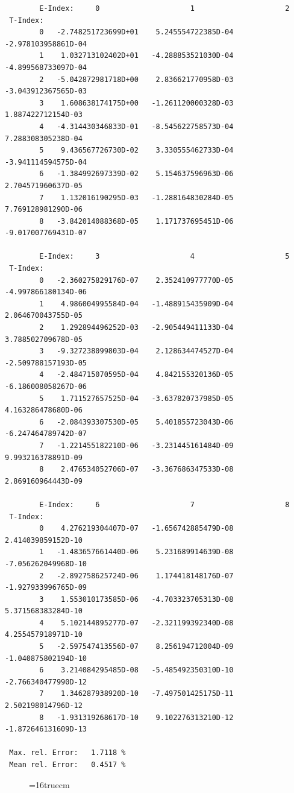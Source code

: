 \documentclass[12pt,dvips]{article}
\begin{document}
\begin{small}\begin{verbatim}
        E-Index:     0                     1                     2
 T-Index:
        0   -2.748251723699D+01    5.245554722385D-04   -2.978103958861D-04
        1    1.032713102402D+01   -4.288853521030D-04   -4.899568733097D-04
        2   -5.042872981718D+00    2.836621770958D-03   -3.043912367565D-03
        3    1.608638174175D+00   -1.261120000328D-03    1.887422712154D-03
        4   -4.314430346833D-01   -8.545622758573D-04    7.288308305238D-04
        5    9.436567726730D-02    3.330555462733D-04   -3.941114594575D-04
        6   -1.384992697339D-02    5.154637596963D-06    2.704571960637D-05
        7    1.132016190295D-03   -1.288164830284D-05    7.769128981290D-06
        8   -3.842014088368D-05    1.171737695451D-06   -9.017007769431D-07

        E-Index:     3                     4                     5
 T-Index:
        0   -2.360275829176D-07    2.352410977770D-05   -4.997866180134D-06
        1    4.986004995584D-04   -1.488915435909D-04    2.064670043755D-05
        2    1.292894496252D-03   -2.905449411133D-04    3.788502709678D-05
        3   -9.327238099803D-04    2.128634474527D-04   -2.509788157193D-05
        4   -2.484715070595D-04    4.842155320136D-05   -6.186008058267D-06
        5    1.711527657525D-04   -3.637820737985D-05    4.163286478680D-06
        6   -2.084393307530D-05    5.401855723043D-06   -6.247464789742D-07
        7   -1.221455182210D-06   -3.231445161484D-09    9.993216378891D-09
        8    2.476534052706D-07   -3.367686347533D-08    2.869160964443D-09

        E-Index:     6                     7                     8
 T-Index:
        0    4.276219304407D-07   -1.656742885479D-08    2.414039859152D-10
        1   -1.483657661440D-06    5.231689914639D-08   -7.056262049968D-10
        2   -2.892758625724D-06    1.174418148176D-07   -1.927933996765D-09
        3    1.553010173585D-06   -4.703323705313D-08    5.371568383284D-10
        4    5.102144895277D-07   -2.321199392340D-08    4.255457918971D-10
        5   -2.597547413556D-07    8.256194712004D-09   -1.040875802194D-10
        6    3.214084295485D-08   -5.485492350310D-10   -2.766340477990D-12
        7    1.346287938920D-10   -7.497501425175D-11    2.502198014796D-12
        8   -1.931319268617D-10    9.102276313210D-12   -1.872646131609D-13

 Max. rel. Error:   1.7118 %
 Mean rel. Error:   0.4517 %

\end{verbatim}\end{small}
\begin{figure} \label{2.2.5}
\epsfxsize=16truecm
\end{figure}
\newpage
\end{document}
